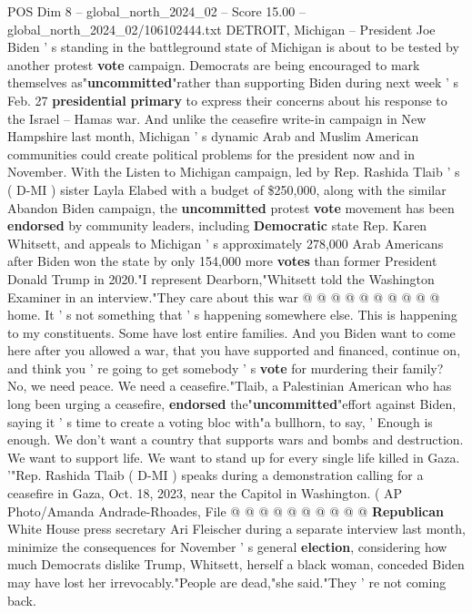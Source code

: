 \begin{textsample}{POS Dim 8 – global\_north\_2024\_02 – Score 15.00 – global\_north\_2024\_02/106102444.txt}  \label{ex:f8_pos_025}
DETROIT, Michigan -- President Joe Biden ' s standing in the battleground state of Michigan is about to be tested by another protest \textbf{vote} campaign.
Democrats are being encouraged to mark themselves as"\textbf{uncommitted}"rather than supporting Biden during next week ' s Feb. 27 \textbf{presidential} \textbf{primary} to express their concerns about his response to the Israel -- Hamas war.
And unlike the ceasefire write-in campaign in New Hampshire last month, Michigan ' s dynamic Arab and Muslim American communities could create political problems for the president now and in November.
With the Listen to Michigan campaign, led by Rep.
Rashida Tlaib ' s ( D-MI ) sister Layla Elabed with a budget of \$250,000, along with the similar Abandon Biden campaign, the \textbf{uncommitted} protest \textbf{vote} movement has been \textbf{endorsed} by community leaders, including \textbf{Democratic} state Rep.
Karen Whitsett, and appeals to Michigan ' s approximately 278,000 Arab Americans after Biden won the state by only 154,000 more \textbf{votes} than former President Donald Trump in 2020."I represent Dearborn,"Whitsett told the Washington Examiner in an interview."They care about this war @ @ @ @ @ @ @ @ @ @ home.
It ' s not something that ' s happening somewhere else.
This is happening to my constituents.
Some have lost entire families.
And you Biden want to come here after you allowed a war, that you have supported and financed, continue on, and think you ' re going to get somebody ' s \textbf{vote} for murdering their family?
No, we need peace.
We need a ceasefire."Tlaib, a Palestinian American who has long been urging a ceasefire, \textbf{endorsed} the"\textbf{uncommitted}"effort against Biden, saying it ' s time to create a voting bloc with"a bullhorn, to say, ' Enough is enough.
We don't want a country that supports wars and bombs and destruction.
We want to support life.
We want to stand up for every single life killed in Gaza. '"Rep.
Rashida Tlaib ( D-MI ) speaks during a demonstration calling for a ceasefire in Gaza, Oct. 18, 2023, near the Capitol in Washington. ( AP Photo/Amanda Andrade-Rhoades, File @ @ @ @ @ @ @ @ @ @ \textbf{Republican} White House press secretary Ari Fleischer during a separate interview last month, minimize the consequences for November ' s general \textbf{election}, considering how much Democrats dislike Trump, Whitsett, herself a black woman, conceded Biden may have lost her irrevocably."People are dead,"she said."They ' re not coming back.

\end{textsample}
